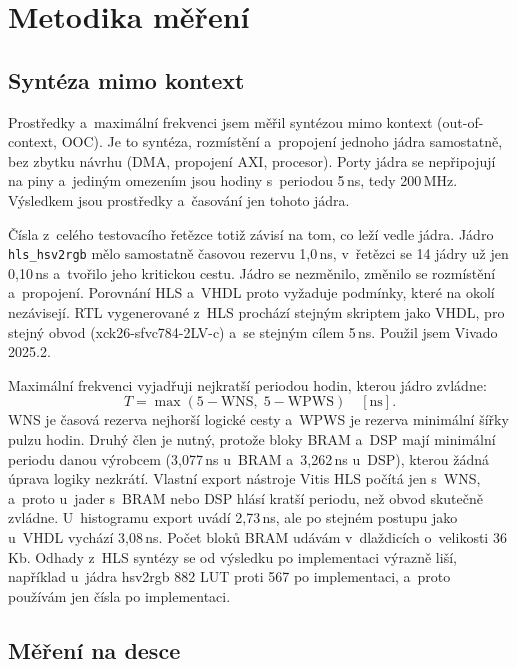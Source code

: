 \documentclass[FM,DP]{tulthesis}
\begin{document}
\section{Metodika měření}
\label{sec:metodika-mereni}

\subsection{Syntéza mimo kontext}
\label{sec:ooc}

Prostředky a~maximální frekvenci jsem měřil syntézou mimo kontext
(out-of-context, \acs{OOC}). Je to syntéza, rozmístění a~propojení jednoho
jádra samostatně, bez zbytku návrhu (DMA, propojení AXI, procesor). Porty jádra
se nepřipojují na piny a~jediným omezením jsou hodiny s~periodou 5\,ns, tedy
200\,MHz. Výsledkem jsou prostředky a~časování jen tohoto jádra.

Čísla z~celého testovacího řetězce totiž závisí na tom, co leží vedle jádra. Jádro \texttt{hls\_hsv2rgb} mělo samostatně časovou rezervu 1,0\,ns, v~řetězci se 14 jádry už jen 0,10\,ns a~tvořilo jeho kritickou cestu. Jádro se nezměnilo, změnilo se rozmístění a~propojení. Porovnání HLS a~VHDL proto vyžaduje podmínky, které na okolí nezávisejí. RTL vygenerované z~HLS prochází stejným skriptem jako VHDL, pro stejný obvod (xck26-sfvc784-2LV-c) a~se stejným cílem 5\,ns. Použil jsem Vivado 2025.2.

Maximální frekvenci vyjadřuji nejkratší periodou hodin, kterou jádro zvládne:
\begin{equation}
    T = \max\left(5 - \mathrm{WNS},\; 5 - \mathrm{WPWS}\right) \quad [\mathrm{ns}] .
    \label{eq:perioda}
\end{equation}
\ac{WNS} je časová rezerva nejhorší logické cesty a~\ac{WPWS} je rezerva minimální šířky pulzu hodin. Druhý člen je nutný, protože bloky BRAM a~DSP mají minimální periodu danou výrobcem (3,077\,ns u~BRAM a~3,262\,ns u~DSP), kterou žádná úprava logiky nezkrátí. Vlastní export nástroje Vitis HLS počítá jen s~WNS, a~proto u~jader s~BRAM nebo DSP hlásí kratší periodu, než obvod skutečně zvládne. U~histogramu export uvádí 2,73\,ns, ale po stejném postupu jako u~VHDL vychází 3,08\,ns. Počet bloků BRAM udávám v~dlaždicích o~velikosti 36\,Kb. Odhady z~HLS syntézy se od výsledku po implementaci výrazně liší, například u~jádra hsv2rgb 882 LUT proti 567 po implementaci, a~proto používám jen čísla po implementaci.

\subsection{Měření na desce}
\label{sec:deska}
\end{document}
